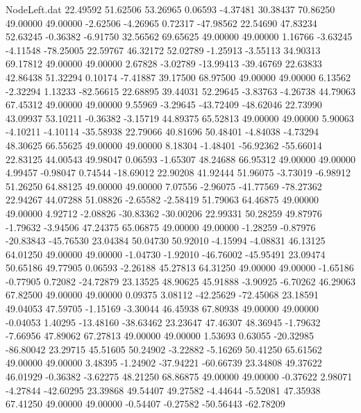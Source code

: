 \begin{filecontents}{NodeLeft.dat}
  22.49592   51.62506   53.26965     0.06593   -4.37481   30.38437   70.86250   49.00000   49.00000   -2.62506   -4.26965    0.72317  -47.98562
  22.54690   47.83234   52.63245    -0.36382   -6.91750   32.56562   69.65625   49.00000   49.00000    1.16766   -3.63245   -4.11548  -78.25005
  22.59767   46.32172   52.02789    -1.25913   -3.55113   34.90313   69.17812   49.00000   49.00000    2.67828   -3.02789  -13.99413  -39.46769
  22.63833   42.86438   51.32294     0.10174   -7.41887   39.17500   68.97500   49.00000   49.00000    6.13562   -2.32294    1.13233  -82.56615
  22.68895   39.44031   52.29645    -3.83763   -4.26738   44.79063   67.45312   49.00000   49.00000    9.55969   -3.29645  -43.72409  -48.62046
  22.73990   43.09937   53.10211    -0.36382   -3.15719   44.89375   65.52813   49.00000   49.00000    5.90063   -4.10211   -4.10114  -35.58938
  22.79066   40.81696   50.48401    -4.84038   -4.73294   48.30625   66.55625   49.00000   49.00000    8.18304   -1.48401  -56.92362  -55.66014
  22.83125   44.00543   49.98047     0.06593   -1.65307   48.24688   66.95312   49.00000   49.00000    4.99457   -0.98047    0.74544  -18.69012
  22.90208   41.92444   51.96075    -3.73019   -6.98912   51.26250   64.88125   49.00000   49.00000    7.07556   -2.96075  -41.77569  -78.27362
  22.94267   44.07288   51.08826    -2.65582   -2.58419   51.79063   64.46875   49.00000   49.00000    4.92712   -2.08826  -30.83362  -30.00206
  22.99331   50.28259   49.87976    -1.79632   -3.94506   47.24375   65.06875   49.00000   49.00000   -1.28259   -0.87976  -20.83843  -45.76530
  23.04384   50.04730   50.92010    -4.15994   -4.08831   46.13125   64.01250   49.00000   49.00000   -1.04730   -1.92010  -46.76002  -45.95491
  23.09474   50.65186   49.77905     0.06593   -2.26188   45.27813   64.31250   49.00000   49.00000   -1.65186   -0.77905    0.72082  -24.72879
  23.13525   48.90625   45.91888    -3.90925   -6.70262   46.29063   67.82500   49.00000   49.00000    0.09375    3.08112  -42.25629  -72.45068
  23.18591   49.04053   47.59705    -1.15169   -3.30044   46.45938   67.80938   49.00000   49.00000   -0.04053    1.40295  -13.48160  -38.63462
  23.23647   47.46307   48.36945    -1.79632   -7.66956   47.89062   67.27813   49.00000   49.00000    1.53693    0.63055  -20.32985  -86.80042
  23.29715   45.51605   50.24902    -3.22882   -5.16269   50.41250   65.61562   49.00000   49.00000    3.48395   -1.24902  -37.94221  -60.66739
  23.34808   49.37622   46.01929    -0.36382   -3.62275   48.21250   68.86875   49.00000   49.00000   -0.37622    2.98071   -4.27844  -42.60295
  23.39868   49.54407   49.27582    -4.44644   -5.52081   47.35938   67.41250   49.00000   49.00000   -0.54407   -0.27582  -50.56443  -62.78209

\end{filecontents}
